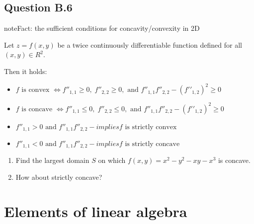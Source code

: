 \documentclass[letterpaper,10pt,english]{jupyterBook}
\begin{document}
\section{Question B.6}
\label{\detokenize{03.exercises:question-b-6}}
\begin{sphinxadmonition}{note}{Fact: the sufficient conditions for concavity/convexity in 2D}

\sphinxAtStartPar
Let \(z = f(x,y)\) be a twice continuously differentiable function defined for all
\((x, y) \in R^2\).

\sphinxAtStartPar
Then it holds:
\begin{itemize}
\item {} 
\sphinxAtStartPar
\(f \text{ is convex } \iff f''_{1,1} \ge 0, \; f''_{2,2} \ge 0 , \text{ and } f''_{1,1} f''_{2,2} − (f′′_{1,2})^2 \ge 0\)

\item {} 
\sphinxAtStartPar
\(f \text{ is concave } \iff f''_{1,1} \le 0, \; f''_{2,2} \le 0 , \text{ and } f''_{1,1} f''_{2,2} − (f′′_{1,2})^2 \ge 0\)

\item {} 
\sphinxAtStartPar
\(f''_{1,1} > 0 \text{ and } f''_{1,1} f''_{2,2} −implies f \text{ is strictly convex}\)

\item {} 
\sphinxAtStartPar
\(f''_{1,1} < 0 \text{ and } f''_{1,1} f''_{2,2} −implies f \text{ is strictly concave}\)

\end{itemize}
\end{sphinxadmonition}
\begin{enumerate}
%
\item {} 
\sphinxAtStartPar
Find the largest domain \(S\) on which
\(f(x, y) = x^2 − y^2 − xy − x^3\) is concave.

\item {} 
\sphinxAtStartPar
How about strictly concave?

\end{enumerate}

\sphinxstepscope


\chapter{Elements of linear algebra}
\label{\detokenize{04.linear_algebra:elements-of-linear-algebra}}\label{\detokenize{04.linear_algebra::doc}}
\end{document}
